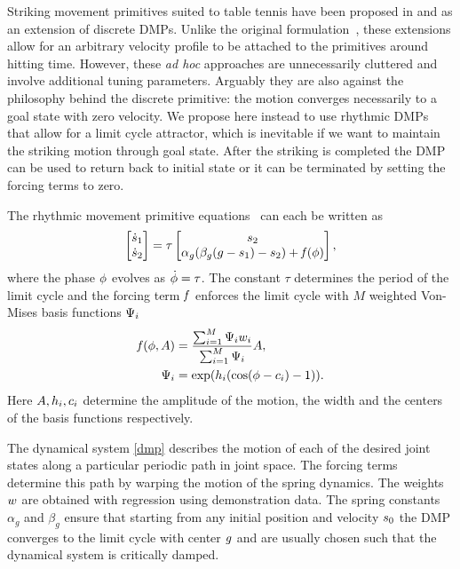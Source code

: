 Striking movement primitives suited to table tennis have been proposed in \cite{Kober10} and \cite{Muelling13} as an extension of discrete DMPs. Unlike the original formulation~\cite{Ijspeert02}, these extensions allow for an arbitrary velocity profile to be attached to the primitives around hitting time. However, these \emph{ad hoc} approaches are unnecessarily cluttered and involve additional tuning parameters. Arguably they are also against the philosophy behind the discrete primitive: the motion converges necessarily to a goal state with zero velocity. We propose here instead to use rhythmic DMPs that allow for a limit cycle attractor, which is inevitable if we want to maintain the striking motion through goal state. After the striking is completed the DMP can be used to return back to initial state or it can be terminated by setting the forcing terms to zero.

The rhythmic movement primitive equations~\cite{Kober08} can each be written as
%
\begin{equation}
\begin{aligned}
\begin{bmatrix}
   \dot{s}_1 \\
   \dot{s}_2
 \end{bmatrix} = \tau \begin{bmatrix}
     s_2  \\
     \alpha_{g} (\beta_{g}(g - s_1) - s_2) +  \mathit{f}(\phi)
  \end{bmatrix}
\label{dmp},
\end{aligned}
\end{equation}
%
\noindent where the phase $\phi$ evolves as $\dot{\phi} = \tau$. The constant $\tau$ determines the period of the limit cycle and the forcing term $\mathit{f}$ enforces the limit cycle with $M$ weighted Von-Mises basis functions $\Psi_i$
%
\begin{equation}
\begin{aligned}
\mathit{f}(\phi,A) &= \frac{\sum_{i=1}^{M}\Psi_i w_i}{\sum_{i=1}^{M}\Psi_i}A, \\
\Psi_i &= \exp(h_i (\cos(\phi - c_i) - 1)).
\label{forcing}
\end{aligned}
\end{equation}
%
\noindent Here $A, h_i, c_i$ determine the amplitude of the motion, the width and the centers of the basis functions respectively.

The dynamical system \eqref{dmp} describes the motion of each of the desired joint states along a particular periodic path in joint space. The forcing terms determine this path by warping the motion of the spring dynamics. The weights $w$ are obtained with regression using demonstration data. The spring constants $\alpha_{g}$ and $\beta_{g}$ ensure that starting from any initial position and velocity $s_0$ the DMP converges to the limit cycle with center $g$ and are usually chosen such that the dynamical system is critically damped.

